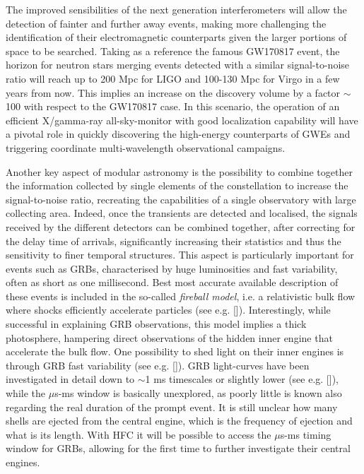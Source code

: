 \documentclass[]{spie}  %
\begin{document}
The improved sensibilities of the next generation interferometers will allow the detection of fainter and further away events, making more challenging the identification of their electromagnetic counterparts given the larger portions of space to be searched. Taking as a reference the famous GW170817 event, the horizon for neutron stars merging events detected with a similar signal-to-noise ratio will reach up to 200 Mpc for LIGO and 100-130 Mpc for Virgo in a few years from now. This implies an increase on the discovery volume by a factor $\sim$100 with respect to the GW170817 case. In this scenario, the operation of an efficient X/gamma-ray all-sky-monitor with good localization capability will have a pivotal role in quickly discovering the high-energy counterparts of GWEs and triggering coordinate multi-wavelength observational campaigns.

Another key aspect of modular astronomy is the possibility to combine together the information collected by single elements of the constellation to increase the signal-to-noise ratio, recreating the capabilities of a single observatory with large collecting area. Indeed, once the transients are detected and localised, the signals received by the different detectors can be combined together, after correcting for the delay time of arrivals, significantly increasing their statistics and thus the sensitivity to finer temporal structures. This aspect is particularly important for events such as GRBs,  characterised by huge luminosities and fast variability, often as short as one millisecond. Best most accurate available description of these events is included in the so-called \emph{fireball model}, i.e. a relativistic bulk flow where shocks efficiently accelerate particles (see e.g. []). Interestingly, while successful in explaining GRB observations, this model implies a thick photosphere, hampering direct observations of the hidden inner engine that accelerate the bulk flow. One possibility to shed light on their inner engines is through GRB fast variability (see e.g. []). GRB light-curves have been investigated in detail down to $\sim$1 ms timescales or slightly lower (see e.g. []), while the $\mu$s-ms window is basically unexplored, as poorly little is known also regarding the real duration of the prompt event. It is still unclear how many shells are ejected from the central engine, which is the frequency of ejection and what is its length. With HFC it will be possible to access the $\mu$s-ms timing window for GRBs, allowing for the first time to further investigate their central engines.
\end{document}
